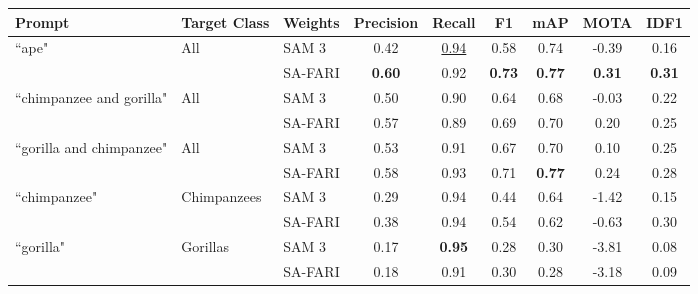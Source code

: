 \documentclass[author={Jacob Stephenson},
    degree={BSc},
    title={Robust Great Ape Species Detection in Wild Camera Trap Imagery with Promptable Concept Segmentation},
    unit={COMS30045},
    subtitle={}]{dissertation}
\begin{document}
\begin{table}[h]
    \centering
    \small
    \setlength{\tabcolsep}{4pt}

    \begin{tabular}{lll|cccc|cc}
        \toprule
        
        \textbf{Prompt} & \textbf{Target Class} & \textbf{Weights} & \textbf{Precision} & \textbf{Recall} & \textbf{F1} & \textbf{mAP} & \textbf{MOTA} & \textbf{IDF1} \\

        \midrule
        
        \multirow{2}{*}{``ape"}
            & \multirow{2}{*}{All}
            & SAM 3 & 0.42 & \underline{0.94} & 0.58 & 0.74 & -0.39 & 0.16 \\
            & & SA-FARI & \textbf{0.60} & 0.92 & \textbf{0.73} & \textbf{0.77} & \textbf{0.31} & \textbf{0.31} \\

        \midrule

        \multirow{2}{*}{``chimpanzee and gorilla"}
            & \multirow{2}{*}{All}
            & SAM 3 & 0.50 & 0.90 & 0.64 & 0.68 & -0.03 & 0.22 \\
            & & SA-FARI & 0.57 & 0.89 & 0.69 & 0.70 & 0.20 & 0.25 \\

        \midrule

        \multirow{2}{*}{``gorilla and chimpanzee"}
            & \multirow{2}{*}{All}
            & SAM 3 & 0.53 & 0.91 & 0.67 & 0.70 & 0.10 & 0.25 \\
            & & SA-FARI & 0.58 & 0.93 & 0.71 & \textbf{0.77} & 0.24 & 0.28 \\

        \midrule
        
        \multirow{2}{*}{``chimpanzee"}
            & \multirow{2}{*}{Chimpanzees}
            & SAM 3 & 0.29 & 0.94 & 0.44 & 0.64 & -1.42 & 0.15 \\
            & & SA-FARI & 0.38 & 0.94 & 0.54 & 0.62 & -0.63 & 0.30 \\

        \midrule

        \multirow{2}{*}{``gorilla"}
            & \multirow{2}{*}{Gorillas}
            & SAM 3 & 0.17 & \textbf{0.95} & 0.28 & 0.30 & -3.81 & 0.08 \\
            & & SA-FARI & 0.18 & 0.91 & 0.30 & 0.28 & -3.18 & 0.09 \\


\end{tabular}
\end{table}
\end{document}
